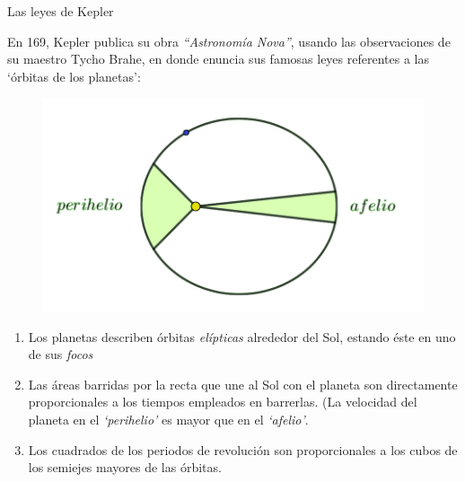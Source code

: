 \begin{myexampleblock}{Las leyes de Kepler}
	
\begin{multicols}{2}
\vspace{2mm}

En 169, Kepler publica su obra \emph{``Astronomía Nova''}, usando las observaciones de su maestro Tycho Brahe, en donde enuncia sus famosas leyes referentes a las `órbitas de los planetas':
\begin{figure}[H]
	\centering
	\includegraphics[width=.4\textwidth]{img-conicas/conicas17.png}
	\end{figure}
\end{multicols}

\vspace{-10mm}
\begin{enumerate}
\item Los planetas describen órbitas \emph{elípticas} alrededor del Sol, estando éste en uno de sus \emph{focos}
\item Las áreas barridas por la recta que une al Sol con el planeta son directamente proporcionales a los tiempos empleados en barrerlas.
(La velocidad del planeta en el \emph{`perihelio'} es mayor que en el \emph{`afelio'}.
\item Los cuadrados de los periodos de revolución son proporcionales a los cubos de los semiejes mayores de las órbitas.
\end{enumerate}
\end{myexampleblock}



\vspace{20mm}

